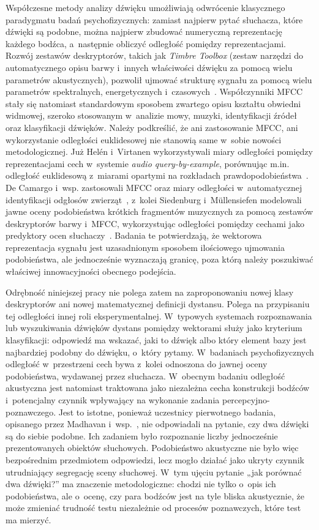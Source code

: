 \documentclass{article}
\begin{document}
Współczesne metody analizy dźwięku umożliwiają odwrócenie klasycznego paradygmatu badań psychofizycznych: zamiast najpierw pytać słuchacza, które dźwięki są podobne, można najpierw zbudować numeryczną reprezentację każdego bodźca, a~następnie obliczyć odległość pomiędzy reprezentacjami. Rozwój zestawów deskryptorów, takich jak \textit{Timbre Toolbox} (zestaw narzędzi do automatycznego opisu barwy i~innych właściwości dźwięku za pomocą wielu parametrów akustycznych), pozwolił ujmować strukturę sygnału za pomocą wielu parametrów spektralnych, energetycznych i~czasowych~\cite{Peeters2011TimbreToolbox}. Współczynniki MFCC stały się natomiast standardowym sposobem zwartego opisu kształtu obwiedni widmowej, szeroko stosowanym w~analizie mowy, muzyki, identyfikacji źródeł oraz klasyfikacji dźwięków. Należy podkreślić, że ani zastosowanie MFCC, ani wykorzystanie odległości euklidesowej nie stanowią same w~sobie nowości metodologicznej. Już Helén i~Virtanen wykorzystywali miary odległości pomiędzy reprezentacjami cech w~systemie \textit{audio query-by-example}, porównując m.in. odległość euklidesową z~miarami opartymi na rozkładach prawdopodobieństwa~\cite{HelenVirtanen2010AudioQuery}. De Camargo i~wsp. zastosowali MFCC oraz miary odległości w~automatycznej identyfikacji odgłosów zwierząt~\cite{DeCamargo2017ProtaxSound}, z~kolei Siedenburg i~Müllensiefen modelowali jawne oceny podobieństwa krótkich fragmentów muzycznych za pomocą zestawów deskryptorów barwy i~MFCC, wykorzystując odległości pomiędzy cechami jako predyktory ocen słuchaczy~\cite{Siedenburg2017TimbreSimilarity}. Badania te potwierdzają, że wektorowa reprezentacja sygnału jest uzasadnionym sposobem ilościowego ujmowania podobieństwa, ale jednocześnie wyznaczają granicę, poza którą należy poszukiwać właściwej innowacyjności obecnego podejścia.

Odrębność niniejszej pracy nie polega zatem na zaproponowaniu nowej klasy deskryptorów ani nowej matematycznej definicji dystansu. Polega na przypisaniu tej odległości innej roli eksperymentalnej. W~typowych systemach rozpoznawania lub wyszukiwania dźwięków dystans pomiędzy wektorami służy jako kryterium klasyfikacji: odpowiedź ma wskazać, jaki to dźwięk albo który element bazy jest najbardziej podobny do dźwięku, o~który pytamy. W~badaniach psychofizycznych odległość w~przestrzeni cech bywa z~kolei odnoszona do jawnej oceny podobieństwa, wydawanej przez słuchacza. W~obecnym badaniu odległość akustyczna jest natomiast traktowana jako niezależna cecha konstrukcji bodźców i~potencjalny czynnik wpływający na wykonanie zadania percepcyjno-poznawczego. Jest to istotne, ponieważ uczestnicy pierwotnego badania, opisanego przez Madhavan i~wsp.~\cite{MadhavanWrobel2024MLT}, nie odpowiadali na pytanie, czy dwa dźwięki są do siebie podobne. Ich zadaniem było rozpoznanie liczby jednocześnie prezentowanych obiektów słuchowych. Podobieństwo akustyczne nie było więc bezpośrednim przedmiotem odpowiedzi, lecz mogło działać jako ukryty czynnik utrudniający segregację sceny słuchowej. W~tym ujęciu pytanie „jak porównać dwa dźwięki?” ma znaczenie metodologiczne: chodzi nie tylko o~opis ich podobieństwa, ale o~ocenę, czy para bodźców jest na tyle bliska akustycznie, że może zmieniać trudność testu niezależnie od procesów poznawczych, które test ma mierzyć.
\end{document}
